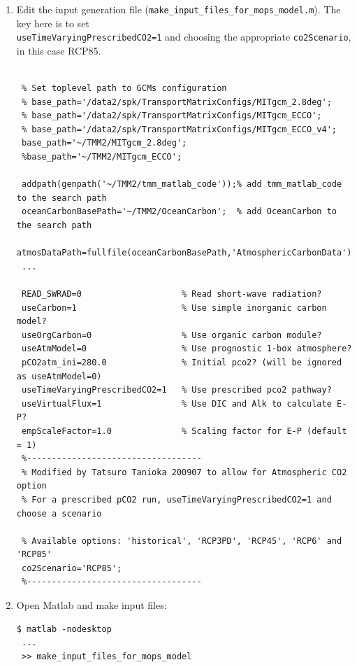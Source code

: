 \documentclass[a4paper]{article}
\begin{document}
\begin{enumerate}
\item Edit the input generation file (\verb|make_input_files_for_mops_model.m|). The key here is to set \\ \verb|useTimeVaryingPrescribedCO2=1| and choosing the appropriate \verb|co2Scenario|, in this case RCP85. 
\lstset{language=matlab} 
\begin{lstlisting}[frame=single,basicstyle=\scriptsize,commentstyle=\color{blue}]
 % make_input_files_for_mops_model.m
 
 % Set toplevel path to GCMs configuration
 % base_path='/data2/spk/TransportMatrixConfigs/MITgcm_2.8deg';
 % base_path='/data2/spk/TransportMatrixConfigs/MITgcm_ECCO';
 % base_path='/data2/spk/TransportMatrixConfigs/MITgcm_ECCO_v4';
 base_path='~/TMM2/MITgcm_2.8deg';
 %base_path='~/TMM2/MITgcm_ECCO';
 
 addpath(genpath('~/TMM2/tmm_matlab_code'));% add tmm_matlab_code to the search path
 oceanCarbonBasePath='~/TMM2/OceanCarbon';  % add OceanCarbon to the search path
 atmosDataPath=fullfile(oceanCarbonBasePath,'AtmosphericCarbonData');
 ...
  
 READ_SWRAD=0                    % Read short-wave radiation?
 useCarbon=1                     % Use simple inorganic carbon model?
 useOrgCarbon=0                  % Use organic carbon module?
 useAtmModel=0                   % Use prognostic 1-box atmosphere?
 pCO2atm_ini=280.0               % Initial pco2? (will be ignored as useAtmModel=0)
 useTimeVaryingPrescribedCO2=1   % Use prescribed pco2 pathway?
 useVirtualFlux=1                % Use DIC and Alk to calculate E-P?
 empScaleFactor=1.0              % Scaling factor for E-P (default = 1)
 %-----------------------------------
 % Modified by Tatsuro Tanioka 200907 to allow for Atmospheric CO2 option
 % For a prescribed pCO2 run, useTimeVaryingPrescribedCO2=1 and choose a scenario
 
 % Available options: 'historical', 'RCP3PD', 'RCP45', 'RCP6' and 'RCP85'
 co2Scenario='RCP85';
 %-----------------------------------
\end{lstlisting}

\item Open Matlab and make input files:
\begin{lstlisting}[style=DOS]
 $ matlab -nodesktop
 ...
 >> make_input_files_for_mops_model
\end{lstlisting}


\end{enumerate}
\end{document}
